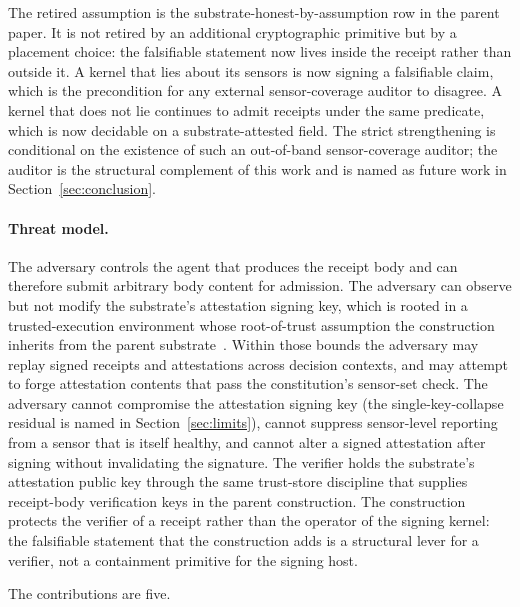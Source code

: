 The retired assumption is the substrate-honest-by-assumption row in the parent paper. It is not retired by an additional cryptographic primitive but by a placement choice: the falsifiable statement now lives inside the receipt rather than outside it. A kernel that lies about its sensors is now signing a falsifiable claim, which is the precondition for any external sensor-coverage auditor to disagree. A kernel that does not lie continues to admit receipts under the same predicate, which is now decidable on a substrate-attested field. The strict strengthening is conditional on the existence of such an out-of-band sensor-coverage auditor; the auditor is the structural complement of this work and is named as future work in Section~\ref{sec:conclusion}.

\paragraph{Threat model.}
The adversary controls the agent that produces the receipt body and can therefore submit arbitrary body content for admission. The adversary can observe but not modify the substrate's attestation signing key, which is rooted in a trusted-execution environment whose root-of-trust assumption the construction inherits from the parent substrate~\cite{chioProgrammableSovereignty2027}. Within those bounds the adversary may replay signed receipts and attestations across decision contexts, and may attempt to forge attestation contents that pass the constitution's sensor-set check. The adversary cannot compromise the attestation signing key (the single-key-collapse residual is named in Section~\ref{sec:limits}), cannot suppress sensor-level reporting from a sensor that is itself healthy, and cannot alter a signed attestation after signing without invalidating the signature. The verifier holds the substrate's attestation public key through the same trust-store discipline that supplies receipt-body verification keys in the parent construction. The construction protects the verifier of a receipt rather than the operator of the signing kernel: the falsifiable statement that the construction adds is a structural lever for a verifier, not a containment primitive for the signing host.

The contributions are five.

